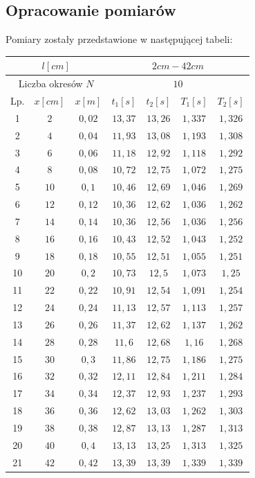 \documentclass{article}
\begin{document}
\subsection{Opracowanie pomiarów}
Pomiary zostały przedstawione w następującej tabeli:
\begin{center}
    \begin{tabular}{|c|c|c|c|c|c|c|}
    \hline
    \multicolumn{3}{|c|}{$l[cm]$} & \multicolumn{4}{|c|}{$2cm-42cm$} \\ \hline
    \multicolumn{3}{|c|}{Liczba okresów $N$} & \multicolumn{4}{|c|}{$10$} \\ \hline
    Lp. & $x[cm]$ & $x[m]$ & $t_1[s]$ & $t_2[s]$ & $T_1[s]$ & $T_2[s]$\\ \hline
    1 & $2$ & $0,02$ & $13,37$ & $13,26$ & $1,337$ & $1,326$ \\ \hline
2 & $4$ & $0,04$ & $11,93$ & $13,08$ & $1,193$ & $1,308$ \\ \hline
3 & $6$ & $0,06$ & $11,18$ & $12,92$ & $1,118$ & $1,292$ \\ \hline
4 & $8$ & $0,08$ & $10,72$ & $12,75$ & $1,072$ & $1,275$ \\ \hline
5 & $10$ & $0,1$ & $10,46$ & $12,69$ & $1,046$ & $1,269$ \\ \hline
6 & $12$ & $0,12$ & $10,36$ & $12,62$ & $1,036$ & $1,262$ \\ \hline
7 & $14$ & $0,14$ & $10,36$ & $12,56$ & $1,036$ & $1,256$ \\ \hline
8 & $16$ & $0,16$ & $10,43$ & $12,52$ & $1,043$ & $1,252$ \\ \hline
9 & $18$ & $0,18$ & $10,55$ & $12,51$ & $1,055$ & $1,251$ \\ \hline
10 & $20$ & $0,2$ & $10,73$ & $12,5$ & $1,073$ & $1,25$ \\ \hline
11 & $22$ & $0,22$ & $10,91$ & $12,54$ & $1,091$ & $1,254$ \\ \hline
12 & $24$ & $0,24$ & $11,13$ & $12,57$ & $1,113$ & $1,257$ \\ \hline
13 & $26$ & $0,26$ & $11,37$ & $12,62$ & $1,137$ & $1,262$ \\ \hline
14 & $28$ & $0,28$ & $11,6$ & $12,68$ & $1,16$ & $1,268$ \\ \hline
15 & $30$ & $0,3$ & $11,86$ & $12,75$ & $1,186$ & $1,275$ \\ \hline
16 & $32$ & $0,32$ & $12,11$ & $12,84$ & $1,211$ & $1,284$ \\ \hline
17 & $34$ & $0,34$ & $12,37$ & $12,93$ & $1,237$ & $1,293$ \\ \hline
18 & $36$ & $0,36$ & $12,62$ & $13,03$ & $1,262$ & $1,303$ \\ \hline
19 & $38$ & $0,38$ & $12,87$ & $13,13$ & $1,287$ & $1,313$ \\ \hline
20 & $40$ & $0,4$ & $13,13$ & $13,25$ & $1,313$ & $1,325$ \\ \hline
21 & $42$ & $0,42$ & $13,39$ & $13,39$ & $1,339$ & $1,339$ \\ \hline
    \end{tabular}
\end{center}
\end{document}
